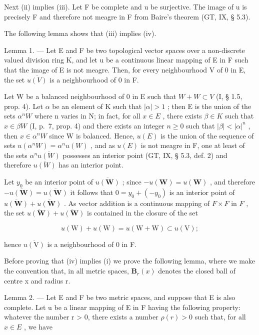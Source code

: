 Next (ii) implies (iii). Let F be complete and u be surjective. The image of u is precisely F and therefore not meagre in F from Baire's theorem (GT, IX, § 5.3).

The following lemma shows that (iii) implies (iv).

Lemma 1. --- Let E and F be two topological vector spaces over a non-discrete valued division ring K, and let u be a continuous linear mapping of E in F such that the image of E is not meagre. Then, for every neighbourhood V of 0 in E, the set \(\overline{u(V)}\) is a neighbourhood of 0 in F.

Let W be a balanced neighbourhood of 0 in E such that \(W + W \subset V\) (I, § 1.5, prop. 4). Let \(\alpha\) be an element of K such that \(|\alpha| > 1\) ; then E is the union of the sets \(\alpha^{n}W\) where n varies in N; in fact, for all \(x \in E\) , there exists \(\beta \in K\) such that \(x \in \beta W\) (I, p.~7, prop. 4) and there exists an integer \(n \geqslant 0\) such that \(|\beta| < |\alpha|^{n}\) , then \(x \in \alpha^{n}W\) since W is balanced. Hence, \(u(E)\) is the union of the sequence of sets \(u(\alpha^{n}W) = \alpha^{n}u(W)\) , and as \(u(E)\) is not meagre in F, one at least of the sets \(\alpha^{n}\overline{u(W)}\) possesses an interior point (GT, IX, § 5.3, def. 2) and therefore \(\overline{u(W)}\) has an interior point.

Let \(y_0\) be an interior point of \(\overline{u(\mathbf{W})}\) ; since \(-u(\mathbf{W}) = u(\mathbf{W})\) , and therefore \(-\overline{u(\mathbf{W})} = \overline{u(\mathbf{W})}\) it follows that \(0 = y_0 + (-y_0)\) is an interior point of \(\overline{u(\mathbf{W})} + \overline{u(\mathbf{W})}\) . As vector addition is a continuous mapping of \(F \times F\) in \(F\) , the set \(\overline{u(\mathbf{W})} + \overline{u(\mathbf{W})}\) is contained in the closure of the set

\[
u (\mathrm{W}) + u (\mathrm{W}) = u (\mathrm{W} + \mathrm{W}) \subset u (\mathrm{V});
\]

hence \(\overline{u(\mathrm{V})}\) is a neighbourhood of 0 in F.

Before proving that (iv) implies (i) we prove the following lemma, where we make the convention that, in all metric spaces, \(\mathbf{B}_{r}(x)\) denotes the closed ball of centre x and radius r.

Lemma 2. --- Let E and F be two metric spaces, and suppose that E is also complete. Let u be a linear mapping of E in F having the following property: whatever the number r \textgreater{} 0, there exists a number \(\rho(r) > 0\) such that, for all \(x \in E\) , we have

